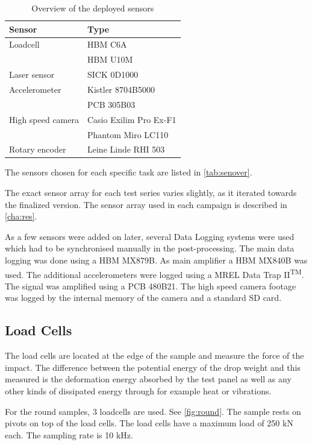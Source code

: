 \begin{table}
    \centering
    \begin{tabular}{ll}
    \toprule
    Sensor & Type \\
    \midrule
Loadcell & HBM C6A \\
& HBM U10M\\
Laser sensor & SICK 0D1000\\
Accelerometer & Kistler 8704B5000  \\
& PCB 305B03\\
High speed camera & Casio Exilim Pro Ex-F1 \\
& Phantom Miro LC110 \\
Rotary encoder & Leine Linde RHI 503 \\

\bottomrule
    \end{tabular}
    \caption{Overview of the deployed sensors}
    \label{tab:senover}
\end{table}

The sensors chosen for each specific task are listed in \autoref{tab:senover}. %

The exact sensor array for each test series varies slightly, as it iterated towards the finalized version. The sensor array used in each campaign is described in \autoref{cha:res}. 

As a few sensors were added on later, several Data Logging systems were used which had to be synchronised manually in the post-processing.
The main data logging was done using a HBM MX879B. As main amplifier a HBM MX840B was used. The additional accelerometers were logged using a MREL Data Trap II\textsuperscript{TM}. The signal was amplified using a PCB 480B21. The high speed camera footage was logged by the internal memory of the camera and a standard SD card. 

\subsection{Load Cells}

The load cells are located at the edge of the sample and measure the force of the impact. The difference between the potential energy of the drop weight and this measured is the deformation energy absorbed by the test panel as well as any other kinds of dissipated energy through for example heat or vibrations.

For the round samples, 3 loadcells are used. See \autoref{fig:round}. The sample rests on pivots on top of the load cells. The load cells have a maximum load of 250 kN each. The sampling rate is 10 kHz. 

